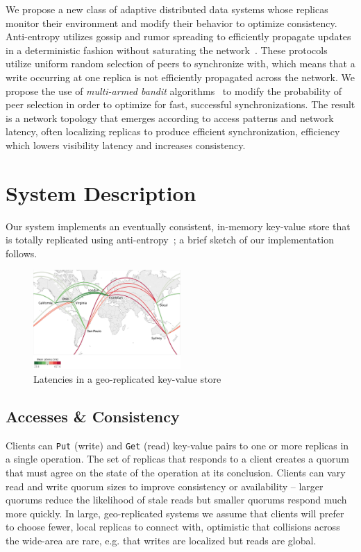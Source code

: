 We propose a new class of adaptive distributed data systems whose replicas
monitor their environment and modify their behavior to optimize consistency.
Anti-entropy utilizes gossip and rumor spreading to efficiently propagate
updates in a deterministic fashion without saturating the
network~\cite{haeupler_simple_2015,karp_randomized_2000,moreno_dynamics_2004}.
These protocols utilize uniform random selection of peers to synchronize
with, which means that a write occurring at one replica is not efficiently
propagated across the network.
We propose the use of \textit{multi-armed bandit}
algorithms~\cite{langford_epoch-greedy_2008,luo_efficient_2017} to modify the
probability of peer selection in order to optimize for fast, successful
synchronizations.
The result is a network topology that emerges according to access patterns
and network latency, often localizing replicas to produce efficient
synchronization, efficiency which lowers visibility latency and increases
consistency.

\section*{System Description}

Our system implements an eventually consistent, in-memory key-value store
that is totally replicated using anti-entropy~\cite{decandia_dynamo:_2007};
a brief sketch of our implementation follows.

\begin{figure}[h]
    \centering
    \includegraphics[width=0.5\textwidth]{figures/network}
    \caption{Latencies in a geo-replicated key-value store}
    \label{fig:network}
\end{figure}

\subsection*{Accesses \& Consistency}

Clients can \texttt{Put} (write) and \texttt{Get} (read) key-value pairs to
one or more replicas in a single operation.
The set of replicas that responds to a client creates a quorum that must
agree on the state of the operation at its conclusion.
Clients can vary read and write quorum sizes to improve consistency or
availability -- larger quorums reduce the likelihood of stale reads but
smaller quorums respond much more quickly.
In large, geo-replicated systems we assume that clients will prefer to choose
fewer, local replicas to connect with, optimistic that collisions across the
wide-area are rare, e.g. that writes are localized but reads are global.

